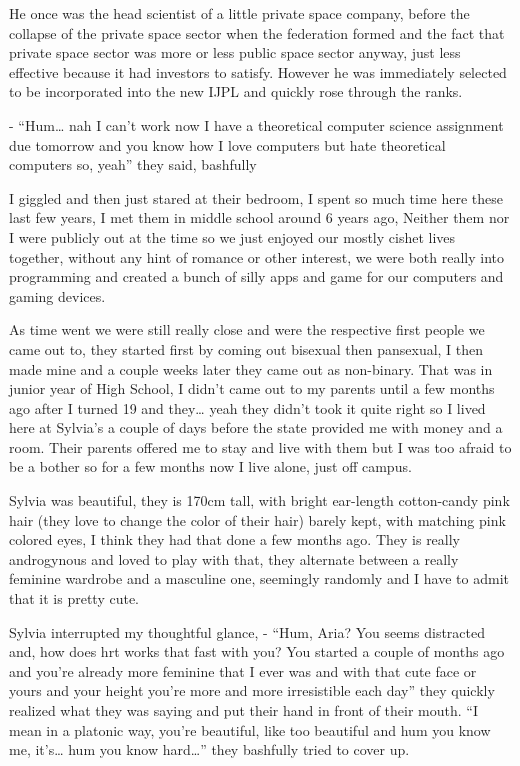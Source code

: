 \documentclass[hidelinks,12pt,a4paper]{book}
\begin{document}
He once was the head scientist of a little private space company, 
before the collapse of the private space sector when the federation formed 
and the fact that private space sector was more or less public space sector anyway, just less effective because 
it had investors to satisfy. However he was immediately selected to be incorporated into the new IJPL and
quickly rose through the ranks.\par
\bigskip

- “Hum… nah I can't work now I have a theoretical computer science assignment due tomorrow 
and you know how I love computers but hate theoretical computers so, yeah” they said, bashfully\par
\bigskip

I giggled and then just stared at their bedroom, 
I spent so much time here these last few years, I met them in middle school around 6 years ago, 
Neither them nor I were publicly out at the time so we just enjoyed our mostly cishet lives together,
 without any hint of romance or other interest, we were both really into programming and created a bunch of
silly apps and game for our computers and gaming devices.\par
\bigskip

As time went we were still really close and were the respective 
first people we came out to, they started first by coming out bisexual then pansexual, 
I then made mine and a couple weeks later they came out as non-binary. That was in junior year of High School,
 I didn't came out to my parents until a few months ago after I turned 19 and they… yeah they didn't took it quite right so
I lived here at Sylvia's a couple of days before the state provided me with money and a room. 
Their parents offered me to stay and live with them but I was too afraid to be a bother so for a few months 
now I live alone, just off campus.\par 
\bigskip

Sylvia was beautiful, they is 170cm tall, with bright ear-length cotton-candy pink hair 
(they love to change the color of their hair) barely kept, with matching pink colored eyes, 
I think they had that done a few months ago. They is really androgynous and loved to play with that, 
they alternate between a really feminine wardrobe and a masculine one, seemingly randomly and 
I have to admit that it is pretty cute.\par
\bigskip

Sylvia interrupted my thoughtful glance,\newline
- “Hum, Aria? You seems distracted and, how does hrt works that fast with you? 
You started a couple of months ago and you're already more feminine that I ever was and with that cute 
face or yours and your height you're more and more irresistible each day” they quickly realized what 
they was saying and put their hand in front of their mouth.\newline
“I mean in a platonic way, you're beautiful, like too beautiful and hum you know me, it's… hum you know hard…” 
they bashfully tried to cover up.\par 
\bigskip
\end{document}
